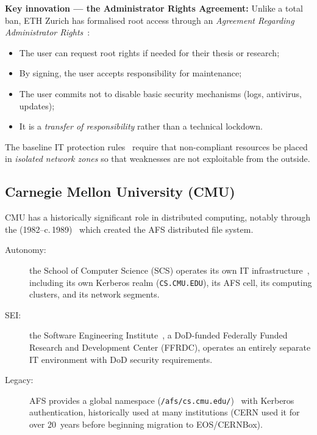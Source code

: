 \textbf{Key innovation --- the Administrator Rights Agreement:}
Unlike a total ban, ETH Zurich has formalised root access through an
\emph{Agreement Regarding Administrator
Rights}~\cite{eth-admin-agreement}:
\begin{itemize}[nosep]
    \item The user can request root rights if needed for their thesis
    or research;
    \item By signing, the user accepts responsibility for maintenance;
    \item The user commits not to disable basic security mechanisms
    (logs, antivirus, updates);
    \item It is a \emph{transfer of responsibility} rather than a
    technical lockdown.
\end{itemize}

The baseline IT protection rules~\cite{eth-baseline} require that
non-compliant resources be placed in \emph{isolated network zones} so
that weaknesses are not exploitable from the outside.

\subsection{Carnegie Mellon University (CMU)}

CMU has a historically significant role in distributed computing,
notably through the  (1982--c.\,1989)~\cite{cmu-andrew}
which created the AFS distributed file system.

\begin{description}
    \item[Autonomy:] the School of Computer Science (SCS) operates its
    own IT infrastructure~\cite{cmu-scs-computing}, including its own
    Kerberos realm (\texttt{CS.CMU.EDU}), its AFS cell, its computing
    clusters, and its network segments.
    \item[SEI:] the Software Engineering Institute~\cite{cmu-sei},
    a DoD-funded Federally Funded Research and Development Center (FFRDC),
    operates an entirely separate IT environment with DoD security
    requirements.
    \item[Legacy:] AFS provides a global namespace
    (\texttt{/afs/cs.cmu.edu/})~\cite{cmu-scs-computing} with Kerberos
    authentication, historically used at many institutions (CERN used it
    for over 20~years before beginning migration to EOS/CERNBox).
\end{description}

